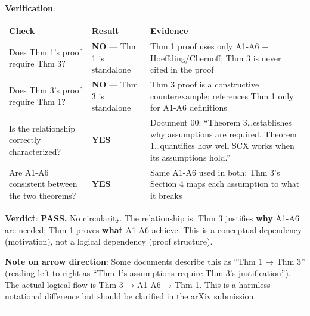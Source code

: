 \documentclass[
  12pt,
]{ctexart}
\begin{document}
\textbf{Verification}:

\begin{longtable}[]{@{}
  >{\raggedright\arraybackslash}p{}
  >{\raggedright\arraybackslash}p{}
  >{\raggedright\arraybackslash}p{}@{}}
\toprule\noalign{}
\begin{minipage}[b]{\linewidth}\raggedright
Check
\end{minipage} & \begin{minipage}[b]{\linewidth}\raggedright
Result
\end{minipage} & \begin{minipage}[b]{\linewidth}\raggedright
Evidence
\end{minipage} \\
\midrule\noalign{}
\endhead
\bottomrule\noalign{}
\endlastfoot
Does Thm 1's proof require Thm 3? & \textbf{NO} --- Thm 1 is standalone
& Thm 1 proof uses only A1-A6 + Hoeffding/Chernoff; Thm 3 is never cited
in the proof \\
Does Thm 3's proof require Thm 1? & \textbf{NO} --- Thm 3 is standalone
& Thm 3 proof is a constructive counterexample; references Thm 1 only
for A1-A6 definitions \\
Is the relationship correctly characterized? & \textbf{YES} & Document
00: ``Theorem 3\ldots establishes why assumptions are required. Theorem
1\ldots quantifies how well SCX works when its assumptions hold.'' \\
Are A1-A6 consistent between the two theorems? & \textbf{YES} & Same
A1-A6 used in both; Thm 3's Section 4 maps each assumption to what it
breaks \\
\end{longtable}

\textbf{Verdict}: \textbf{PASS.} No circularity. The relationship is:
Thm 3 justifies \textbf{why} A1-A6 are needed; Thm 1 proves
\textbf{what} A1-A6 achieve. This is a conceptual dependency
(motivation), not a logical dependency (proof structure).

\textbf{Note on arrow direction}: Some documents describe this as ``Thm
1 → Thm 3'' (reading left-to-right as ``Thm 1's assumptions require Thm
3's justification''). The actual logical flow is Thm 3 → A1-A6 → Thm 1.
This is a harmless notational difference but should be clarified in the
arXiv submission.

\begin{center}\rule{0.5\linewidth}{0.5pt}\end{center}
\end{document}

